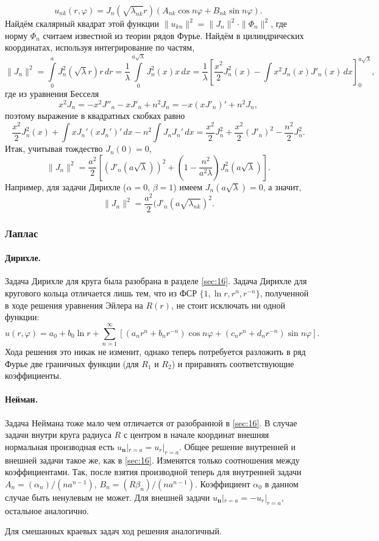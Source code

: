 \[
  u_{nk}(r, \varphi) = J_n(\sqrt{\lambda_{nk}} r)(A_{nk}\cos n\varphi +
  B_{nk}\sin
  n\varphi).
\]
Найдём скалярный квадрат этой функции $ \|u_{kn}\|^2 =
\|J_n\|^2\cdot\|\Phi_n\|^2 $, где норму $ \Phi_n $ считаем известной из
теории рядов Фурье. Найдём в цилиндрических координатах, используя
интегрирование по частям,
\[
    \|J_n\|^2 = \int\limits_{0}^{a} J^2_n(\sqrt\lambda r)r\,dr =
    \frac{1}{\lambda}\int\limits_{0}^{a\sqrt\lambda}J^2_n(x)x\,dx =
    \frac{1}{\lambda} \left[ \frac{x^2}{2}J^2_n(x) -
    \int x^2 J_n(x)J'_n(x)\,dx  \right]^{a\sqrt\lambda}_0,
\]
где из уравнения Бесселя
\[
  x^2 J_n = -x^2 J''_n - xJ'_n + n^2J_n = - x(xJ'_n)' + n^2 J_n,
\]
поэтому выражение в квадратных скобках равно
\[
  \frac{x^2}{2} J^2_n(x) + \int xJ_n' (xJ_n')'\,dx - n^2 \int J_n J_n' \, dx
  =
  \frac{x^2}{2} J^2_n + \frac{x^2}{2} (J'_n)^2 - \frac{n^2}{2} J^2_n.
\]
Итак, учитывая тождество $ J_n(0) = 0 $,
\[
    \|J_n\|^2 = \frac{a^2}{2} \left[ (J'_n(a\sqrt\lambda))^2 + \left( 1 -
    \frac{n^2}{a^2\lambda} \right) J_n^2 (a\sqrt\lambda) \right].
\]
Например, для задачи Дирихле ($ \alpha = 0 $, $ \beta = 1 $) имеем $
J_n(a\sqrt\lambda) = 0 $, а значит,  
\[
  \|J_n\|^2 = \frac{a^2}{2} (J'_n(a\sqrt{\lambda_{nk}})^2.
\]





\subsubsection{Лаплас}
\paragraph{Дирихле.} Задача Дирихле для круга была разобрана в разделе \ref{sec:16}. Задача Дирихле
для кругового кольца отличается лишь тем, что из ФСР $ \{1, \ln r, r^n, r^{-n}\}
$, полученной в ходе решения уравнения Эйлера на $ R(r) $, не стоит исключать ни
одной функции:
\[
  u(r,\varphi) = a_0 + b_0\ln r + \sum_{n=1}^\infty [(a_nr^n + b_nr^{-n})\cos
  n\varphi + (c_n r^n + d_n r^{-n})\sin n\varphi].
\]
Хода решения это никак не изменит, однако теперь потребуется
разложить в ряд Фурье две граничных функции (для $ R_1 $ и $ R_2 $) и приравнять
соответствующие коэффициенты.

\paragraph{Нейман.} 
Задача Неймана тоже мало чем отличается от разобранной в \ref{sec:16}. В случае задачи внутри круга радиуса $ R $ с центром
в начале координат внешняя нормальная производная есть $ u_{\mathbf n}|_{r = a}
= u_r|_{r = a}$. Общее решение внутренней и внешней задачи такое же, как в
\ref{sec:16}. Изменятся только соотношения между коэффициентами. Так, после
взятия производной теперь для
внутренней задачи $
A_n = (\alpha_n)/(na^{n-1}) $, $ B_n = (R\beta_n)/(na^{n-1}) $. Коэффициент $
\alpha_0 $ в данном случае быть ненулевым не может. Для внешней задачи $
u_{\mathbf n}|_{r=a} = -u_r|_{r=a} $, остальное аналогично.

Для смешанных краевых задач ход решения аналогичный.
